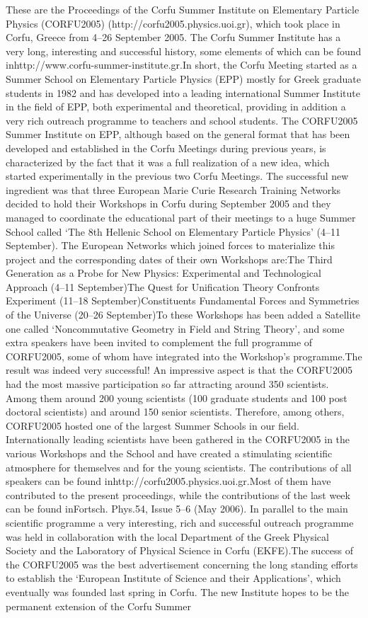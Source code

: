\documentclass[a4paper,10pt]{article}
\begin{document}
\begin{enumerate}
These are the Proceedings of the Corfu Summer Institute on Elementary Particle Physics (CORFU2005) (http://corfu2005.physics.uoi.gr), which took place in Corfu, Greece from 4–26 September 2005. The Corfu Summer Institute has a very long, interesting and successful history, some elements of which can be found inhttp://www.corfu-summer-institute.gr.In short, the Corfu Meeting started as a Summer School on Elementary Particle Physics (EPP) mostly for Greek graduate students in 1982 and has developed into a leading international Summer Institute in the field of EPP, both experimental and theoretical, providing in addition a very rich outreach programme to teachers and school students. The CORFU2005 Summer Institute on EPP, although based on the general format that has been developed and established in the Corfu Meetings during previous years, is characterized by the fact that it was a full realization of a new idea, which started experimentally in the previous two Corfu Meetings. The successful new ingredient was that three European Marie Curie Research Training Networks decided to hold their Workshops in Corfu during September 2005 and they managed to coordinate the educational part of their meetings to a huge Summer School called `The 8th Hellenic School on Elementary Particle Physics' (4–11 September). The European Networks which joined forces to materialize this project and the corresponding dates of their own Workshops are:The Third Generation as a Probe for New Physics: Experimental and Technological Approach (4–11 September)The Quest for Unification Theory Confronts Experiment (11–18 September)Constituents Fundamental Forces and Symmetries of the Universe (20–26 September)To these Workshops has been added a Satellite one called `Noncommutative Geometry in Field and String Theory', and some extra speakers have been invited to complement the full programme of CORFU2005, some of whom have integrated into the Workshop's programme.The result was indeed very successful! An impressive aspect is that the CORFU2005 had the most massive participation so far attracting around 350 scientists. Among them around 200 young scientists (100 graduate students and 100 post doctoral scientists) and around 150 senior scientists. Therefore, among others, CORFU2005 hosted one of the largest Summer Schools in our field. Internationally leading scientists have been gathered in the CORFU2005 in the various Workshops and the School and have created a stimulating scientific atmosphere for themselves and for the young scientists. The contributions of all speakers can be found inhttp://corfu2005.physics.uoi.gr.Most of them have contributed to the present proceedings, while the contributions of the last week can be found inFortsch. Phys.54, Issue 5–6 (May 2006). In parallel to the main scientific programme a very interesting, rich and successful outreach programme was held in collaboration with the local Department of the Greek Physical Society and the Laboratory of Physical Science in Corfu (EKFE).The success of the CORFU2005 was the best advertisement concerning the long standing efforts to establish the `European Institute of Science and their Applications', which eventually was founded last spring in Corfu. The new Institute hopes to be the permanent extension of the Corfu Summer 
\end{enumerate}
\end{document}
